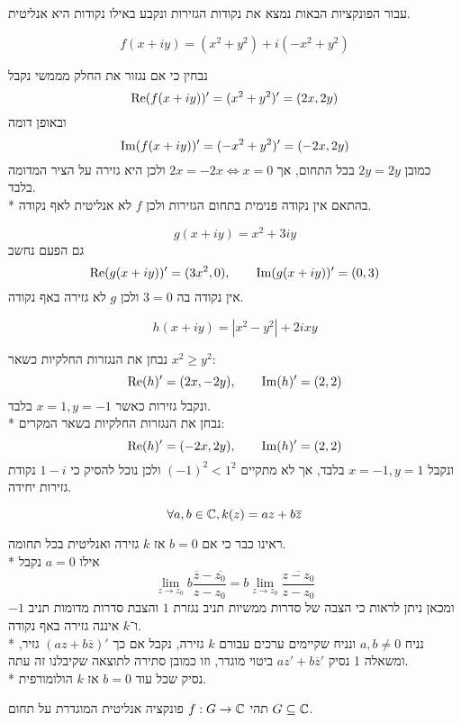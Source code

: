 \Question{}
עבור הפונקציות הבאות נמצא את נקודות הגזירות ונקבע באילו נקודות היא אנליטית.

\Subquestion{}
\[
	f(x + iy) = (x^2 + y^2) + i (-x^2 + y^2)
\]
\begin{solution}
	נבחין כי אם נגזור את החלק מממשי נקבל
	\[
		\operatorname{Re}(f(x + iy))' = (x^2 + y^2)' = (2x, 2y)
	\]
	ובאופן דומה
	\[
		\operatorname{Im}(f(x + iy))' = (-x^2 + y^2)' = (-2x, 2y)
	\]
	כמובן $2y = 2y$ בכל התחום, אך $2x = - 2x \iff x = 0$ ולכן היא גזירה על הציר המדומה בלבד. \\*
	בהתאם אין נקודה פנימית בתחום הגזירות ולכן $f$ לא אנליטית לאף נקודה.
\end{solution}

\Subquestion{}
\[
	g(x + iy) = x^2 + 3iy
\]
גם הפעם נחשב
\[
	\operatorname{Re}(g(x + iy))' = (3x^2, 0),
	\qquad
	\operatorname{Im}(g(x + iy))' = (0, 3)
\]
אין נקודה בה $3 = 0$ ולכן $g$ לא גזירה באף נקודה.

\Subquestion{}
\[
	h(x + iy) = |x^2 - y^2| + 2i xy
\]
\begin{solution}
	נבחן את הנגזרות החלקיות כשאר $x^2 \ge y^2$:
	\[
		\operatorname{Re}(h)' = (2x , -2y),
		\qquad
		\operatorname{Im}(h)' = (2, 2)
	\]
	ונקבל גזירות כאשר $x = 1, y = -1$ בלבד. \\*
	נבחן את הנגזרות החלקיות בשאר המקרים:
	\[
		\operatorname{Re}(h)' = (-2x, 2y),
		\qquad
		\operatorname{Im}(h)' = (2, 2)
	\]
	ונקבל $x = -1, y = 1$ בלבד, אך לא מתקיים ${(-1)}^2 < 1^2$ ולכן נוכל להסיק כי $1 - i$ נקודת גזירות יחידה.
\end{solution}

\Subquestion{}
\[
	\forall a, b \in \mathbb{C},
	k(z) = az + b \overline{z}
\]
\begin{solution}
	ראינו כבר כי אם $b = 0$ אז $k$ גזירה ואנליטית בכל תחומה. \\*
	אילו $a = 0$ נקבל
	\[
		\lim_{z \to z_0} b\frac{\overline{z} - \overline{z_0}}{z - z_0}
		= b \lim_{z \to z_0} \frac{\overline{z - z_0}}{z - z_0}
	\]
	ומכאן ניתן לראות כי הצבה של סדרות ממשיות תניב נגזרת $1$ והצבת סדרות מדומות תניב $-1$ ו־$k$ איננה גזירה באף נקודה. \\*
	נניח $a, b \ne 0$ ונניח שקיימים ערכים עבורם $k$ גזירה, נקבל אם כך $(a z + b \overline{z})'$ גזיר, ומשאלה 1 נסיק $az' + b\overline{z}'$ ביטוי מוגדר, וזו כמובן סתירה לתוצאה שקיבלנו זה עתה. \\*
	נסיק שכל עוד $b = 0$ אז $k$ הולומורפית.
\end{solution}

\Question{}
תהי $f : G \to \mathbb{C}$ פונקציה אנליטית המוגדרת על תחום $G \subseteq \mathbb{C}$.

